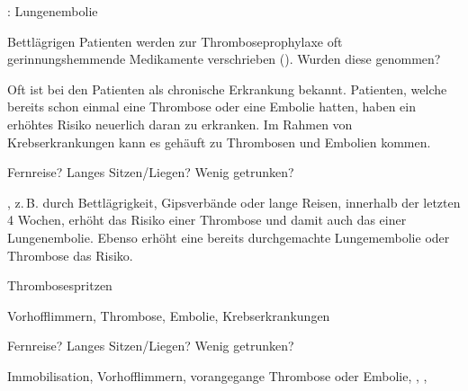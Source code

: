 \TextSlide
{{\TxSAMPLER}: Lungenembolie}
{
\begin{SAMPLERText}
  \item[\SAMPLER{M}] Bettlägrigen Patienten werden zur
  Thromboseprophylaxe oft gerinnungshemmende Medikamente
  verschrieben (). Wurden diese
  genommen?
  \item[\SAMPLER{P}]
  Oft ist bei den Patienten  als
  chronische Erkrankung bekannt. Patienten, welche bereits
  schon einmal eine Thrombose oder eine Embolie hatten,
  haben ein erhöhtes Risiko neuerlich daran zu erkranken. Im
  Rahmen von Krebserkrankungen kann es gehäuft zu Thrombosen
  und Embolien kommen.
  \item[\SAMPLER{E}] Fernreise? Langes Sitzen/Liegen? Wenig
  getrunken?
  \item[\SAMPLER{R}] , z.\,B. durch Bettlägrigkeit,
  Gipsverbände oder lange Reisen, innerhalb der letzten 4
  Wochen, erhöht das Risiko einer Thrombose und damit auch das
  einer Lungenembolie. Ebenso erhöht eine bereits durchgemachte 
  Lungemembolie oder Thrombose das Risiko. 
\end{SAMPLERText}
}
{
\begin{SAMPLERSlide}
  \item[\SAMPLER{M}] Thrombosespritzen
  \item[\SAMPLER{P}] Vorhofflimmern, Thrombose, Embolie,
  Krebserkrankungen
  \item[\SAMPLER{E}] Fernreise? Langes Sitzen/Liegen? Wenig
  getrunken?
  \item[\SAMPLER{R}] Immobilisation, Vorhofflimmern, vorangegange Thrombose oder Embolie, 
  , , 
\end{SAMPLERSlide}
}
{}
{}
{}









